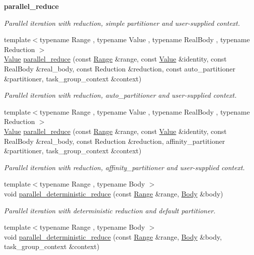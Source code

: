 \begin{Indent}{\bf parallel\+\_\+reduce}
\begin{DoxyCompactItemize}
\begin{DoxyCompactList}\small\item\em Parallel iteration with reduction, simple partitioner and user-\/supplied context. \end{DoxyCompactList}\item 
{\footnotesize template$<$typename Range , typename Value , typename Real\+Body , typename Reduction $>$ }\\\hyperlink{structValue}{Value} \hyperlink{group__algorithms_ga24ba50caf5a7c32cbd38912508cb69a4}{parallel\+\_\+reduce} (const \hyperlink{classtbb_1_1blocked__range}{Range} \&range, const \hyperlink{structValue}{Value} \&identity, const Real\+Body \&real\+\_\+body, const Reduction \&reduction, const auto\+\_\+partitioner \&partitioner, task\+\_\+group\+\_\+context \&context)
\begin{DoxyCompactList}\small\item\em Parallel iteration with reduction, auto\+\_\+partitioner and user-\/supplied context. \end{DoxyCompactList}\item 
{\footnotesize template$<$typename Range , typename Value , typename Real\+Body , typename Reduction $>$ }\\\hyperlink{structValue}{Value} \hyperlink{group__algorithms_ga367a8e77c4dac3f8764785afdc6c9299}{parallel\+\_\+reduce} (const \hyperlink{classtbb_1_1blocked__range}{Range} \&range, const \hyperlink{structValue}{Value} \&identity, const Real\+Body \&real\+\_\+body, const Reduction \&reduction, affinity\+\_\+partitioner \&partitioner, task\+\_\+group\+\_\+context \&context)
\begin{DoxyCompactList}\small\item\em Parallel iteration with reduction, affinity\+\_\+partitioner and user-\/supplied context. \end{DoxyCompactList}\item 
{\footnotesize template$<$typename Range , typename Body $>$ }\\void \hyperlink{group__algorithms_ga1fd7e3c43592dfe1ae3e3572bd80d4f6}{parallel\+\_\+deterministic\+\_\+reduce} (const \hyperlink{classtbb_1_1blocked__range}{Range} \&range, \hyperlink{classBody}{Body} \&body)
\begin{DoxyCompactList}\small\item\em Parallel iteration with deterministic reduction and default partitioner. \end{DoxyCompactList}\item 
{\footnotesize template$<$typename Range , typename Body $>$ }\\void \hyperlink{group__algorithms_ga361201f81b4ec7b86f81b579d2db647a}{parallel\+\_\+deterministic\+\_\+reduce} (const \hyperlink{classtbb_1_1blocked__range}{Range} \&range, \hyperlink{classBody}{Body} \&body, task\+\_\+group\+\_\+context \&context)

\end{DoxyCompactItemize}
\end{Indent}

